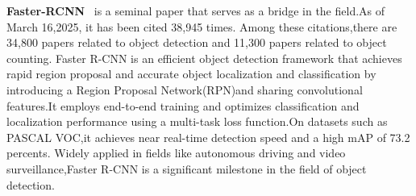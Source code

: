 \documentclass[lettersize,journal]{IEEEtran}
\begin{document}
\textbf{Faster-RCNN}~\cite{Ren2017-ou} is a seminal paper that serves as a bridge in the field.As of March 16,2025, it has been cited 38,945 times. Among these citations,there are 34,800 papers related to object detection and 11,300 papers related to object counting. Faster R-CNN is an efficient object detection framework that achieves rapid region proposal and accurate object localization and classification by introducing a Region Proposal Network(RPN)and sharing convolutional features.It employs end-to-end training and optimizes classification and localization performance using a multi-task loss function.On datasets such as PASCAL VOC,it achieves near real-time detection speed and a high mAP of 73.2 percents. Widely applied in fields like autonomous driving and video surveillance,Faster R-CNN is a significant milestone in the field of object detection.
\end{document}
